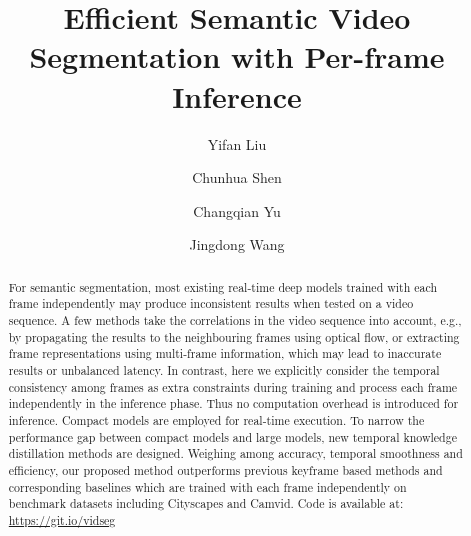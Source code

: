 \documentclass[runningheads]{llncs}
\begin{document}
\pagestyle{headings}
\mainmatter
\def\ECCVSubNumber{1094}  

\title{Efficient Semantic Video Segmentation with Per-frame Inference} 



\author{Yifan Liu
\and
Chunhua Shen
\and
Changqian Yu
\and
Jingdong Wang
}

\maketitle


\captionsetup{margin=0.1pt,font=footnotesize,labelfont=bf}

\begin{abstract}


For semantic segmentation, most existing real-time deep models trained with each frame independently may produce inconsistent results
when tested on
a video sequence.  A few methods take the correlations in the video sequence into account, e.g., by propagating the results to the neighbouring frames using optical flow, or extracting
frame representations
using multi-frame information, which may lead to inaccurate results or unbalanced latency.
In contrast, here we explicitly consider the temporal consistency among frames as extra constraints during training and process each frame independently in the inference phase.
Thus no computation overhead is introduced for inference.
Compact models are employed for real-time execution. To narrow the performance gap between compact models and large models, new temporal knowledge distillation methods are designed. Weighing among accuracy, temporal smoothness and efficiency, our proposed method outperforms previous keyframe based methods and corresponding baselines which are trained with each frame independently on benchmark datasets including Cityscapes and Camvid. Code is available at: \url{https://git.io/vidseg}

\end{abstract}
\end{document}

